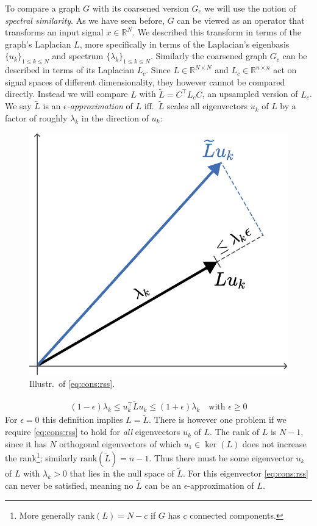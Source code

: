 To compare a graph $G$ with its coarsened version $G_c$ we will use the notion of \textit{spectral similarity}.
As we have seen before, $G$ can be viewed as an operator that transforms an input signal $x \in \mathbb{R}^N$.
We described this transform in terms of the graph's Laplacian $L$,
more specifically in terms of the Laplacian's eigenbasis ${\{ u_k \}}_{1 \leq k \leq N}$ and spectrum ${\{ \lambda_k \}}_{1 \leq k \leq N}$.
Similarly the coarsened graph $G_c$ can be described in terms of its Laplacian $L_c$.
Since $L \in \mathbb{R}^{N \times N}$ and $L_c \in \mathbb{R}^{n \times n}$ act on signal spaces of different dimensionality, they however cannot be compared directly.
Instead we will compare $L$ with $\widetilde{L} = C^{\top} L_c C$, an upsampled version of $L_c$.
We say $\widetilde{L}$ is an \textit{$\epsilon$-approximation} of $L$ iff.\  $\widetilde{L}$ scales all eigenvectors $u_k$ of $L$ by a factor of roughly $\lambda_k$ in the direction of $u_k$:
\begin{figure}
	\centering
	\includegraphics[width=\linewidth]{gfx/cons/rss.pdf}
	\caption{Illustr.\ of \cref{eq:cons:rss}.}\label{fig:cons:rss}
\end{figure}
\begin{align}
	(1 - \epsilon) \lambda_k \leq u_k^{\top} \widetilde{L} u_k \leq (1 + \epsilon) \lambda_k\quad\text{with } \epsilon \geq 0\label{eq:cons:rss}
\end{align}
For $\epsilon = 0$ this definition implies $L = \widetilde{L}$.
There is however one problem if we require \cref{eq:cons:rss} to hold for \textit{all} eigenvectors $u_k$ of $L$.
The rank of $L$ is $N - 1$, since it has $N$ orthogonal eigenvectors of which $u_1 \in \ker(L)$ does not increase the rank\footnote{%
	More generally $\text{rank}(L) = N - c$ if $G$ has $c$ connected components.
};
similarly $\text{rank}(\widetilde{L}) = n - 1$.
Thus there must be some eigenvector $u_k$ of $L$ with $\lambda_k > 0$ that lies in the null space of $\widetilde{L}$.
For this eigenvector \cref{eq:cons:rss} can never be satisfied, meaning no $\widetilde{L}$ can be an $\epsilon$-approximation of $L$.

